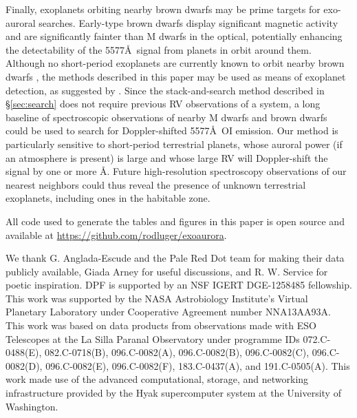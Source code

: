 \documentclass{emulateapj}
\begin{document}
Finally, exoplanets orbiting nearby brown dwarfs may be prime targets for exo-auroral searches. Early-type brown dwarfs display significant magnetic activity \citep{West2008} and are significantly fainter than M dwarfs in the optical, potentially enhancing the detectability of the 5577\AA\ signal from planets in orbit around them. Although no short-period exoplanets are currently known to orbit nearby brown dwarfs \citep{He2016}, the methods described in this paper may be used as means of exoplanet detection, as suggested by \citet{SparksFord2002}. Since the stack-and-search method described in \S\ref{sec:search} does not require previous RV observations of a system, a long baseline of spectroscopic observations of nearby M dwarfs and brown dwarfs could be used to search for Doppler-shifted 5577\AA\ OI emission. Our method is particularly sensitive to short-period terrestrial planets, whose auroral power (if an atmosphere is present) is large and whose large RV will Doppler-shift the signal by one or more \AA. Future high-resolution spectroscopy observations of our nearest neighbors could thus reveal the presence of unknown terrestrial exoplanets, including ones in the habitable zone.

All code used to generate the tables and figures in this paper is open source and available at \url{https://github.com/rodluger/exoaurora}.

\pagebreak

\acknowledgments

We thank G. Anglada-Escude and the Pale Red Dot team for making their data publicly available, Giada Arney for useful discussions, and R. W. Service for poetic inspiration. DPF is supported by an NSF IGERT DGE-1258485 fellowship. This work was supported by the NASA Astrobiology Institute’s Virtual Planetary Laboratory under Cooperative Agreement number NNA13AA93A. This work was based on data products from observations made with ESO Telescopes at the La Silla Paranal Observatory under programme IDs 072.C-0488(E), 082.C-0718(B), 096.C-0082(A), 096.C-0082(B), 096.C-0082(C), 096.C-0082(D), 096.C-0082(E), 096.C-0082(F), 183.C-0437(A), and 191.C-0505(A). This work made use of the advanced computational, storage, and networking infrastructure provided by the Hyak supercomputer system at the University of Washington.



\end{document}
